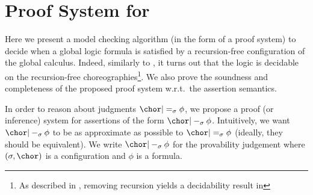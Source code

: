 \section{Proof System for \GL}\label{Logic4Struct:sec:proofSys}

Here we  present a
model checking algorithm (in the form of a proof system) to decide
when a global logic formula is satisfied by a recursion-free
configuration of the global calculus. Indeed, similarly to
\cite{ct:csl01}, it turns out that the logic is decidable on the
recursion-free choreographies\footnote{As described in \cite{Carbone2010Towards-a-Modal}, removing recursion yields a
  decidability result in \GL}. We also prove the soundness and
completeness of the proposed proof system w.r.t.~the assertion
semantics.

In order to reason about judgments $\chor |=_\sigma \phi$, we propose
a proof (or inference) system for assertions of the form $\chor
|-_\sigma \phi$.  Intuitively, we want $\chor |-_\sigma \phi$ to be as
approximate as possible to $\chor |=_\sigma \phi$ (ideally, they
should be equivalent).  We write $\chor |-_\sigma \phi $ for the
provability judgement where $(\sigma,\chor)$ is a configuration and
$\phi$ is a formula.  

